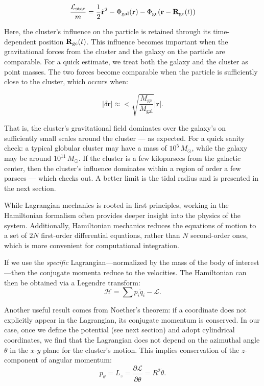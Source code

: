         \begin{equation}
            \frac{\mathcal{L}_{\rm star}}{m} = \frac{1}{2} \dot{\mathbf{r}}^2 
                                - \Phi_{\rm gal}(\mathbf{r}) 
                                - \Phi_{\rm gc}(\mathbf{r} - \mathbf{R}_{\rm gc}(t))
        \end{equation}

        Here, the cluster's influence on the particle is retained through its time-dependent position \( \mathbf{R}_{\rm gc}(t) \). This influence becomes important when the gravitational forces from the cluster and the galaxy on the particle are comparable. For a quick estimate, we treat both the galaxy and the cluster as point masses. The two forces become comparable when the particle is sufficiently close to the cluster, which occurs when:

        \begin{equation}
            |\delta \mathbf{r}| \approx < \sqrt{\frac{M_{\mathrm{gc}}}{M_{\mathrm{ gal}}}} |\mathbf{r}|.
        \end{equation}


        That is, the cluster's gravitational field dominates over the galaxy's on sufficiently small scales around the cluster — as expected. For a quick sanity check: a typical globular cluster may have a mass of \(10^5\, M_\odot\), while the galaxy may be around \(10^{11}\, M_\odot\). If the cluster is a few kiloparsecs from the galactic center, then the cluster's influence dominates within a region of order a few parsecs — which checks out. A better limit is the tidal radius and is presented in the next section.

        While Lagrangian mechanics is rooted in first principles, working in the Hamiltonian formalism often provides deeper insight into the physics of the system. Additionally, Hamiltonian mechanics reduces the equations of motion to a set of \(2N\) first-order differential equations, rather than \(N\) second-order ones, which is more convenient for computational integration.

        If we use the \textit{specific} Lagrangian—normalized by the mass of the body of interest—then the conjugate momenta reduce to the velocities. The Hamiltonian can then be obtained via a Legendre transform:
        \begin{equation}
            \mathcal{H} = \sum p_i \dot{q}_i - \mathcal{L}.
        \end{equation}

        Another useful result comes from Noether's theorem: if a coordinate does not explicitly appear in the Lagrangian, its conjugate momentum is conserved. In our case, once we define the potential (see next section) and adopt cylindrical coordinates, we find that the Lagrangian does not depend on the azimuthal angle \( \theta \) in the \(x\text{-}y\) plane for the cluster's motion. This implies conservation of the \(z\)-component of angular momentum:
        \begin{equation}
            p_\theta = L_z = \frac{\partial \mathcal{L}}{\partial \dot{\theta}} = R^2 \dot{\theta}.
        \end{equation}

